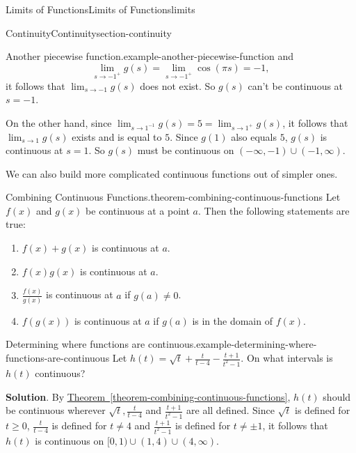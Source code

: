 \documentclass[oneside,10pt,]{book}
\numberwithin{equation}{section}
\begin{document}
\begin{chapterptx}{Limits of Functions}{}{Limits of Functions}{}{}{limits}
\begin{sectionptx}{Continuity}{}{Continuity}{}{}{section-continuity}
\begin{example}{Another piecewise function.}{example-another-piecewise-function}
and%
\begin{equation*}
\lim_{s\to-1^{+}}g(s) = \lim_{s\to-1^{+}}\cos(\pi s) = -1,
\end{equation*}
it follows that \(\lim_{s\to-1}g(s)\) does not exist. So \(g(s)\) can't be continuous at \(s=-1\).%
\par
\hypertarget{p-45}{}%
On the other hand, since \(\lim_{s\to1^{-1}}g(s) = 5 = \lim_{s\to1^{+}}g(s)\), it follows that \(\lim_{s\to1}g(s)\) exists and is equal to \(5\). Since \(g(1)\) also equals \(5\), \(g(s)\) is continuous at \(s=1\). So \(g(s)\) must be continuous on \((-\infty, -1)\cup(-1,\infty)\).%
\end{example}
\hypertarget{p-46}{}%
We can also build more complicated continuous functions out of simpler ones.%
\begin{theorem}{Combining Continuous Functions.}{}{theorem-combining-continuous-functions}%
\hypertarget{p-47}{}%
Let \(f(x)\) and \(g(x)\) be continuous at a point \(a\). Then the following statements are true:\leavevmode%
\begin{enumerate}
\item\hypertarget{li-1}{}\(f(x)+g(x)\) is continuous at \(a\).%
\item\hypertarget{li-2}{}\(f(x)g(x)\) is continuous at \(a\).%
\item\hypertarget{li-3}{}\(\frac{f(x)}{g(x)}\) is continuous at \(a\) if \(g(a)\neq0\).%
\item\hypertarget{li-4}{}\(f(g(x))\) is continuous at \(a\) if \(g(a)\) is in the domain of \(f(x)\).%
\end{enumerate}
%
\end{theorem}
\begin{example}{Determining where functions are continuous.}{example-determining-where-functions-are-continuous}%
\hypertarget{p-48}{}%
Let \(h(t) = \sqrt{t} + \frac{t}{t-4} - \frac{t+1}{t^{2}-1}\). On what intervals is \(h(t)\) continuous?%
\par\smallskip%
\noindent\textbf{Solution}.\hypertarget{solution-9}{}\quad%
\hypertarget{p-49}{}%
By \hyperref[theorem-combining-continuous-functions]{Theorem~\ref{theorem-combining-continuous-functions}}, \(h(t)\) should be continuous wherever \(\sqrt{t}, \frac{t}{t-4}\) and \(\frac{t+1}{t^{2}-1}\) are all defined. Since \(\sqrt{t}\) is defined for \(t\geq0\), \(\frac{t}{t-4}\) is defined for \(t\neq4\) and \(\frac{t+1}{t^{2}-1}\) is defined for \(t\neq\pm1\), it follows that \(h(t)\) is continuous on \([0,1)\cup(1,4)\cup(4,\infty)\).%
\end{example}

\end{sectionptx}
\end{chapterptx}
\end{document}
